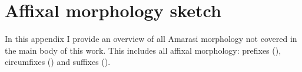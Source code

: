 \chapter{Affixal morphology sketch}\label{ch:MorphSketch}
In this appendix I provide an overview of all Amarasi morphology
not covered in the main body of this work.
This includes all affixal morphology: prefixes (),
circumfixes () and suffixes ().



